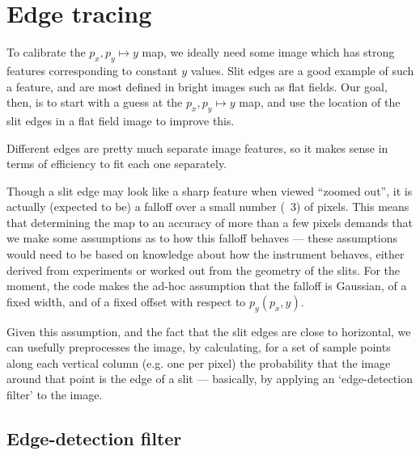 \section{Edge tracing}
\label{sec:edgeTracing}

To calibrate the $p_x, p_y \mapsto y$ map, we ideally need some image
which has strong features corresponding to constant $y$ values. Slit
edges are a good example of such a feature, and are most defined in
bright images such as flat fields. Our goal, then, is to start with a
guess at the $p_x, p_y \mapsto y$ map, and use the location of the slit
edges in a flat field image to improve this.

Different edges are pretty much separate image features, so it makes
sense in terms of efficiency to fit each one separately.

Though a slit edge may look like a sharp feature when viewed ``zoomed
out'', it is actually (expected to be) a falloff over a small number
(~3) of pixels. This means that determining the map to an accuracy
of more than a few pixels demands that we make some assumptions as
to how this falloff behaves --- these assumptions would need to be
based on knowledge about how the instrument behaves, either derived
from experiments or worked out from the geometry of the slits. For
the moment, the code makes the ad-hoc assumption that the falloff is
Gaussian, of a fixed width, and of a fixed offset with respect to
$p_y(p_x, y)$.

Given this assumption, and the fact that the slit edges are close to
horizontal, we can usefully preprocesses the image, by calculating,
for a set of sample points along each vertical column (e.g. one per pixel)
the probability that the image around that point is the edge of a slit
--- basically, by applying an `edge-detection filter' to the image.

\subsection{Edge-detection filter}

